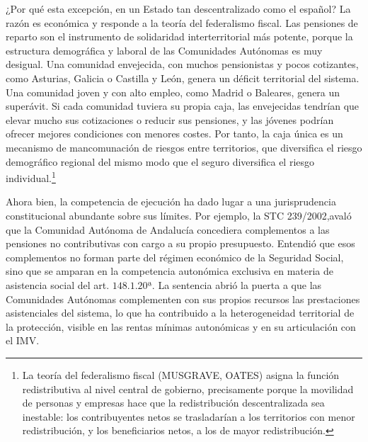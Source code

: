 \documentclass[10pt,a4paper]{article}
\begin{document}
¿Por qué esta excepción, en un Estado tan descentralizado como el español? La razón es económica y responde a la teoría del federalismo fiscal. Las pensiones de reparto son el instrumento de solidaridad interterritorial más potente, porque la estructura demográfica y laboral de las Comunidades Autónomas es muy desigual. Una comunidad envejecida, con muchos pensionistas y pocos cotizantes, como Asturias, Galicia o Castilla y León, genera un déficit territorial del sistema. Una comunidad joven y con alto empleo, como Madrid o Baleares, genera un superávit. Si cada comunidad tuviera su propia caja, las envejecidas tendrían que elevar mucho sus cotizaciones o reducir sus pensiones, y las jóvenes podrían ofrecer mejores condiciones con menores costes. Por tanto, la caja única es un mecanismo de mancomunación de riesgos entre territorios, que diversifica el riesgo demográfico regional del mismo modo que el seguro diversifica el riesgo individual.\footnote{%
    La teoría del federalismo fiscal (MUSGRAVE, OATES) asigna la función redistributiva al nivel central de gobierno, precisamente porque la movilidad de personas y empresas hace que la redistribución descentralizada sea inestable: los contribuyentes netos se trasladarían a los territorios con menor redistribución, y los beneficiarios netos, a los de mayor redistribución.
}

Ahora bien, la competencia de ejecución ha dado lugar a una jurisprudencia constitucional abundante sobre sus límites. Por ejemplo, la STC 239/2002,avaló que la Comunidad Autónoma de Andalucía concediera complementos a las pensiones no contributivas con cargo a su propio presupuesto. Entendió que esos complementos no forman parte del régimen económico de la Seguridad Social, sino que se amparan en la competencia autonómica exclusiva en materia de asistencia social del art. $148.1.20$ª. La sentencia abrió la puerta a que las Comunidades Autónomas complementen con sus propios recursos las prestaciones asistenciales del sistema, lo que ha contribuido a la heterogeneidad territorial de la protección, visible en las rentas mínimas autonómicas y en su articulación con el IMV.
\end{document}
